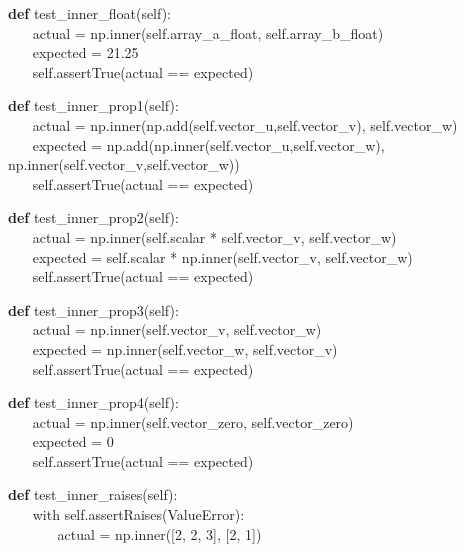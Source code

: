 \begin{algorithm}[H]
\textbf{def} test\_inner\_float(self):
\\ $ ~~~~~~~~ $actual = np.inner(self.array\_a\_float, self.array\_b\_float)
\\ $ ~~~~~~~~ $expected = 21.25
\\ $ ~~~~~~~~ $self.assertTrue(actual == expected)
\end{algorithm}

\begin{algorithm}[H]
\textbf{def} test\_inner\_prop1(self): 
\\ $ ~~~~~~~~ $actual = np.inner(np.add(self.vector\_u,self.vector\_v), self.vector\_w)
\\ $ ~~~~~~~~ $expected = np.add(np.inner(self.vector\_u,self.vector\_w), np.inner(self.vector\_v,self.vector\_w))
\\ $ ~~~~~~~~ $self.assertTrue(actual == expected)
\end{algorithm}

\begin{algorithm}[H]
\textbf{def} test\_inner\_prop2(self):
\\ $ ~~~~~~~~ $actual = np.inner(self.scalar * self.vector\_v, self.vector\_w)
\\ $ ~~~~~~~~ $expected = self.scalar * np.inner(self.vector\_v, self.vector\_w)
\\ $ ~~~~~~~~ $self.assertTrue(actual == expected)
\end{algorithm}

\begin{algorithm}[H]
\textbf{def} test\_inner\_prop3(self):
\\ $ ~~~~~~~~ $actual = np.inner(self.vector\_v, self.vector\_w)
\\ $ ~~~~~~~~ $expected = np.inner(self.vector\_w, self.vector\_v)
\\ $ ~~~~~~~~ $self.assertTrue(actual == expected)
\end{algorithm}

\begin{algorithm}[H]
\textbf{def} test\_inner\_prop4(self):
\\ $ ~~~~~~~~ $actual = np.inner(self.vector\_zero, self.vector\_zero)
\\ $ ~~~~~~~~ $expected = 0
\\ $ ~~~~~~~~ $self.assertTrue(actual == expected)
\end{algorithm}

\begin{algorithm}[H]
\textbf{def} test\_inner\_raises(self):
\\ $ ~~~~~~~~ $with self.assertRaises(ValueError):
\\ $ ~~~~~~~~~~~~~~~~ $actual = np.inner([2, 2, 3], [2, 1])
\end{algorithm}

